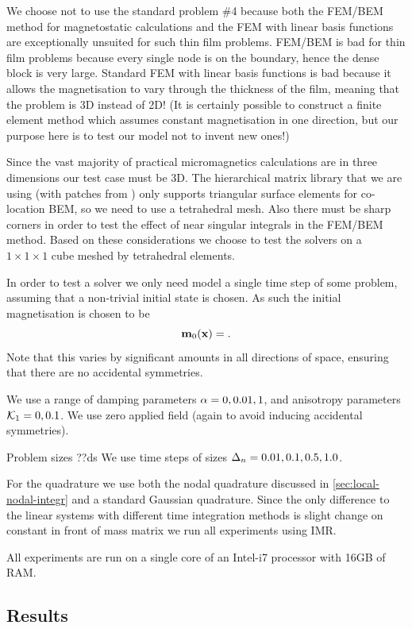 We choose not to use the \mumag standard problem \#4 because both the FEM/BEM method for magnetostatic calculations and the FEM with linear basis functions are exceptionally unsuited for such thin film problems.
FEM/BEM is bad for thin film problems because every single node is on the boundary, hence the dense block is very large.
Standard FEM with linear basis functions is bad because it allows the magnetisation to vary through the thickness of the film, meaning that the problem is 3D instead of 2D!
(It is certainly possible to construct a finite element method which assumes constant magnetisation in one direction, but our purpose here is to test our model not to invent new ones!)

Since the vast majority of practical micromagnetics calculations are in three dimensions our test case must be 3D.
The hierarchical matrix library that we are using (\hlib with patches from \nmag) only supports triangular surface elements for co-location BEM, so we need to use a tetrahedral mesh.
Also there must be sharp corners in order to test the effect of near singular integrals in the FEM/BEM method.
Based on these considerations we choose to test the solvers on a $1\times 1 \times 1$ cube meshed by tetrahedral elements.

In order to test a solver we only need model a single time step of some problem, assuming that a non-trivial initial state is chosen.
As such the initial magnetisation is chosen to be
\begin{equation}
  \boldsymbol{\mathrm{m}}_0(\boldsymbol{\mathrm{x}}) = .
\end{equation}
Note that this varies by significant amounts in all directions of space, ensuring that there are no accidental symmetries.

We use a range of damping parameters $\alpha = 0, 0.01, 1$, and anisotropy parameters $\mathcal{K}_1 = 0, 0.1$.
We use zero applied field (again to avoid inducing accidental symmetries).

Problem sizes ??ds
We use time steps of sizes $\Delta_{n} = 0.01, 0.1, 0.5, 1.0$.

For the quadrature we use both the nodal quadrature discussed in \cref{sec:local-nodal-integr} and a standard Gaussian quadrature.
Since the only difference to the linear systems with different time integration methods is slight change on constant in front of mass matrix we run all experiments using IMR.

All experiments are run on a single core of an Intel-i7 processor with 16GB of RAM.


\subsection{Results}

